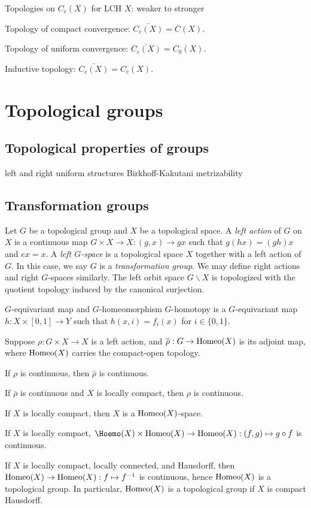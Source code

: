 \documentclass{../../large}
\begin{document}
Topologies on $C_c(X)$ for LCH $X$: weaker to stronger
\begin{parts}
\item Topology of compact convergence: $\bar{C_c(X)}=C(X)$.
\item Topology of uniform convergence: $\bar{C_c(X)}=C_0(X)$.
\item Inductive topology: $\bar{C_c(X)}=C_c(X)$.
\end{parts}



\chapter{Topological groups}

\section{Topological properties of groups}
left and right uniform structures
Birkhoff-Kakutani
metrizability

\section{Transformation groups}

\begin{prb}
Let $G$ be a topological group and $X$ be a topological space.
A \emph{left action} of $G$ on $X$ is a continuous map $G\times X\to X:(g,x)\to gx$ such that $g(hx)=(gh)x$ and $ex=x$.
A \emph{left $G$-space} is a topological space $X$ together with a left action of $G$.
In this case, we say $G$ is a \emph{transformation group}.
We may define right actions and right $G$-spaces similarly.
The left orbit space $G\backslash X$ is topologized with the quotient topology induced by the canonical surjection.


$G$-equivariant map and $G$-homeomorphism
$G$-homotopy is a $G$-equivariant map $h:X\times[0,1]\to Y$ such that $h(x,i)=f_i(x)$ for $i\in\{0,1\}$.
\end{prb}

\begin{prb}
Suppose $\rho:G\times X\to X$ is a left action, and $\overline\rho:G\to\operatorname{Homeo}(X)$ is its adjoint map, where $\operatorname{Homeo}(X)$ carries the compact-open topology.
\begin{parts}
\item If $\rho$ is continuous, then $\bar\rho$ is continuous.
\item If $\bar\rho$ is continuous and $X$ is locally compact, then $\rho$ is continuous.
\item If $X$ is locally compact, then $X$ is a $\operatorname{Homeo}(X)$-space.
\item If $X$ is locally compact, $\Hoemo(X)\times\Homeo(X)\to\Homeo(X):(f,g)\mapsto g\circ f$ is continuous.
\item If $X$ is locally compact, locally connected, and Hausdorff, then $\operatorname{Homeo}(X)\to\operatorname{Homeo}(X):f\mapsto f^{-1}$ is continuous, hence $\operatorname{Homeo}(X)$ is a topological group.
In particular, $\operatorname{Homeo}(X)$ is a topological group if $X$ is compact Hausdorff.
\end{parts}
\end{prb}
\end{document}
